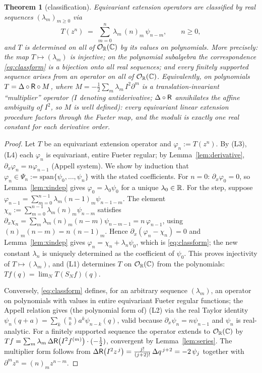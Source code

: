 \documentclass[11pt]{amsart}
\newtheorem{theorem}{Theorem}[section]
\theoremstyle{definition}
\theoremstyle{remark}
\begin{document}
\begin{theorem}[classification]\label{thm:linclass}
Equivariant extension operators are classified by real sequences
$(\lambda_m)_{m\ge0}$ via
\begin{equation}\label{eq:classform}
T(z^n)\;=\;\sum_{m=0}^{n}\lambda_m\,(n)_m\,\psi_{n-m},
\qquad n\ge0,
\end{equation}
and $T$ is determined on all of $\mathcal{O}_{\mathbb{R}}(\mathbb{C})$ by its values on polynomials.
More precisely: the map $T\mapsto(\lambda_m)$ is injective; on the
polynomial subalgebra the correspondence \eqref{eq:classform} is a
bijection onto all real sequences; and every finitely supported sequence
arises from an operator on all of $\mathcal{O}_{\mathbb{R}}(\mathbb{C})$.  Equivalently, on polynomials
$T=\Delta\circ\mathsf{R}\circ M$, where
$M=-\tfrac12\sum_m\lambda_m\,I^2\partial^m$ is a translation-invariant
``multiplier'' operator \textup{(}$I$ denoting antiderivative;
$\Delta\circ\mathsf{R}$ annihilates the affine ambiguity of $I^2$, so $M$ is
well defined\textup{)}: \emph{every equivariant linear extension
procedure factors through the Fueter map}, and the moduli is exactly one
real constant for each derivative order.
\end{theorem}

\begin{proof}
Let $T$ be an equivariant extension operator and $\varphi_n:=T(z^n)$.  By
(L3), (L4) each $\varphi_n$ is equivariant, entire Fueter regular; by
Lemma~\ref{lem:derivative}, $\partial_x\varphi_n=n\varphi_{n-1}$
(Appell system).  We show by induction that
$\varphi_n\in\Psi_n:=\mathrm{span}\{\psi_0,\dots,\psi_n\}$ with the stated
coefficients.  For $n=0$: $\partial_x\varphi_0=0$, so
Lemma~\ref{lem:xindep} gives $\varphi_0=\lambda_0\psi_0$ for a unique
$\lambda_0\in\mathbb{R}$.  For the step, suppose
$\varphi_{n-1}=\sum_{m=0}^{n-1}\lambda_m(n-1)_m\psi_{n-1-m}$.  The
element $\chi_n:=\sum_{m=0}^{n-1}\lambda_m(n)_m\psi_{n-m}$ satisfies
$\partial_x\chi_n=\sum_m\lambda_m(n)_m(n-m)\psi_{n-m-1}
=n\,\varphi_{n-1}$, using $(n)_m(n-m)=n\,(n-1)_m$.  Hence
$\partial_x(\varphi_n-\chi_n)=0$ and Lemma~\ref{lem:xindep} gives
$\varphi_n=\chi_n+\lambda_n\psi_0$, which is \eqref{eq:classform}; the new
constant $\lambda_n$ is uniquely determined as the coefficient of
$\psi_0$.  This proves injectivity of $T\mapsto(\lambda_m)$, and (L1)
determines $T$ on $\mathcal{O}_{\mathbb{R}}(\mathbb{C})$ from the polynomials:
$Tf(q)=\lim_NT(S_Nf)(q)$.

Conversely, \eqref{eq:classform} defines, for an arbitrary sequence
$(\lambda_m)$, an operator on polynomials with values in entire
equivariant Fueter regular functions; the Appell relation gives
\textup{(}the polynomial form of\textup{)} (L2) via the real Taylor
identity $\psi_n(q+a)=\sum_k\binom nk a^k\psi_{n-k}(q)$, valid because
$\partial_x\psi_n=n\psi_{n-1}$ and $\psi_n$ is real-analytic.  For a
finitely supported sequence the operator extends to $\mathcal{O}_{\mathbb{R}}(\mathbb{C})$ by
$Tf=\sum_m\lambda_m\,\Delta\mathsf{R}\bigl(I^2f^{(m)}\bigr)\cdot(-\tfrac12)$,
convergent by Lemma~\ref{lem:series}.  The multiplier form follows from
$\Delta\mathsf{R}\bigl(I^2z^{\,j}\bigr)
=\tfrac{j!}{(j+2)!}\,\Delta q^{\,j+2}=-2\,\psi_{j}$
together with $\partial^mz^n=(n)_mz^{n-m}$.
\end{proof}
\end{document}
